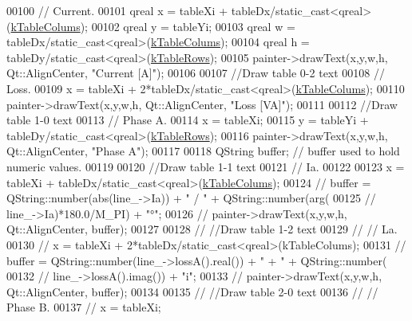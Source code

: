 \begin{DoxyCode}
00100   \textcolor{comment}{// Current.}
00101   qreal x = tableXi + tableDx/\textcolor{keyword}{static\_cast<}qreal\textcolor{keyword}{>}(\hyperlink{class_info_line_a9fc071b08eb913cf3afc623835ad2fd8}{kTableColums});
00102   qreal y = tableYi;
00103   qreal w = tableDx/\textcolor{keyword}{static\_cast<}qreal\textcolor{keyword}{>}(\hyperlink{class_info_line_a9fc071b08eb913cf3afc623835ad2fd8}{kTableColums});
00104   qreal h = tableDy/\textcolor{keyword}{static\_cast<}qreal\textcolor{keyword}{>}(\hyperlink{class_info_line_a95cdc7a95cde6db7c6faceda995d26b9}{kTableRows});
00105   painter->drawText(x,y,w,h, Qt::AlignCenter, \textcolor{stringliteral}{"Current [A]"});
00106 
00107   \textcolor{comment}{//Draw table 0-2 text}
00108   \textcolor{comment}{// Loss.}
00109   x = tableXi + 2*tableDx/\textcolor{keyword}{static\_cast<}qreal\textcolor{keyword}{>}(\hyperlink{class_info_line_a9fc071b08eb913cf3afc623835ad2fd8}{kTableColums});
00110   painter->drawText(x,y,w,h, Qt::AlignCenter, \textcolor{stringliteral}{"Loss [VA]"});
00111 
00112   \textcolor{comment}{//Draw table 1-0 text}
00113   \textcolor{comment}{// Phase A.}
00114   x = tableXi;
00115   y = tableYi + tableDy/\textcolor{keyword}{static\_cast<}qreal\textcolor{keyword}{>}(\hyperlink{class_info_line_a95cdc7a95cde6db7c6faceda995d26b9}{kTableRows});
00116   painter->drawText(x,y,w,h, Qt::AlignCenter, \textcolor{stringliteral}{"Phase A"});
00117 
00118   QString buffer; \textcolor{comment}{// buffer used to hold numeric values.}
00119 
00120   \textcolor{comment}{//Draw table 1-1 text}
00121   \textcolor{comment}{// Ia.}
00122 
00123   x = tableXi + tableDx/\textcolor{keyword}{static\_cast<}qreal\textcolor{keyword}{>}(\hyperlink{class_info_line_a9fc071b08eb913cf3afc623835ad2fd8}{kTableColums});
00124 \textcolor{comment}{//  buffer = QString::number(abs(line\_->Ia)) + " / " + QString::number(arg(}
00125 \textcolor{comment}{//             line\_->Ia)*180.0/M\_PI) + "°";}
00126 \textcolor{comment}{//  painter->drawText(x,y,w,h, Qt::AlignCenter, buffer);}
00127 
00128 \textcolor{comment}{//  //Draw table 1-2 text}
00129 \textcolor{comment}{//  // La.}
00130 \textcolor{comment}{//  x = tableXi + 2*tableDx/static\_cast<qreal>(kTableColums);}
00131 \textcolor{comment}{//  buffer = QString::number(line\_->lossA().real()) + " + " + QString::number(}
00132 \textcolor{comment}{//             line\_->lossA().imag()) + "i";}
00133 \textcolor{comment}{//  painter->drawText(x,y,w,h, Qt::AlignCenter, buffer);}
00134 
00135 \textcolor{comment}{//  //Draw table 2-0 text}
00136 \textcolor{comment}{//  // Phase B.}
00137 \textcolor{comment}{//  x = tableXi;}

\end{DoxyCode}
